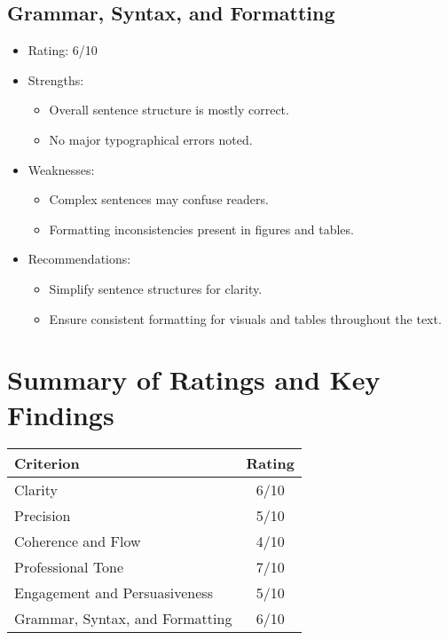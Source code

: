 \documentclass[11pt]{article}
\begin{document}
\subsection{Grammar, Syntax, and Formatting}
\begin{itemize}
    \item Rating: 6/10
    \item Strengths:
        \begin{itemize}
            \item Overall sentence structure is mostly correct.
            \item No major typographical errors noted.
        \end{itemize}
    \item Weaknesses:
        \begin{itemize}
            \item Complex sentences may confuse readers.
            \item Formatting inconsistencies present in figures and tables.
        \end{itemize}
    \item Recommendations:
        \begin{itemize}
            \item Simplify sentence structures for clarity.
            \item Ensure consistent formatting for visuals and tables throughout the text.
        \end{itemize}
\end{itemize}

\section{Summary of Ratings and Key Findings}
\begin{tabular}{|l|c|}
    \hline
    \textbf{Criterion} & \textbf{Rating} \\
    \hline
    Clarity & 6/10 \\
    Precision & 5/10 \\
    Coherence and Flow & 4/10 \\
    Professional Tone & 7/10 \\
    Engagement and Persuasiveness & 5/10 \\
    Grammar, Syntax, and Formatting & 6/10 \\
    \hline
\end{tabular}
\end{document}
